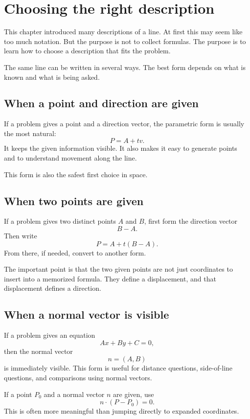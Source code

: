 \section{Choosing the right description}

This chapter introduced many descriptions of a line. At first this may seem like too much notation. But the purpose is not to collect formulas. The purpose is to learn how to choose a description that fits the problem.

The same line can be written in several ways. The best form depends on what is known and what is being asked.

\subsection*{When a point and direction are given}

If a problem gives a point and a direction vector, the parametric form is usually the most natural:
\[
P=A+t v.
\]
It keeps the given information visible. It also makes it easy to generate points and to understand movement along the line.

This form is also the safest first choice in space.

\subsection*{When two points are given}

If a problem gives two distinct points \(A\) and \(B\), first form the direction vector
\[
B-A.
\]
Then write
\[
P=A+t(B-A).
\]
From there, if needed, convert to another form.

The important point is that the two given points are not just coordinates to insert into a memorized formula. They define a displacement, and that displacement defines a direction.

\subsection*{When a normal vector is visible}

If a problem gives an equation
\[
Ax+By+C=0,
\]
then the normal vector
\[
n=(A,B)
\]
is immediately visible. This form is useful for distance questions, side-of-line questions, and comparisons using normal vectors.

If a point \(P_0\) and a normal vector \(n\) are given, use
\[
n\cdot(P-P_0)=0.
\]
This is often more meaningful than jumping directly to expanded coordinates.

